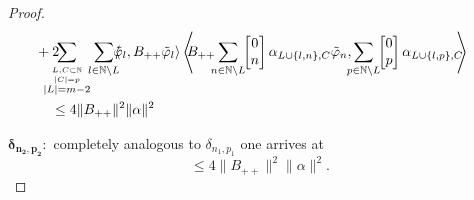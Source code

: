 \documentclass[b5paper,draft,openbib,12pt]{memoir}
\begin{document}
\begin{proof}
\begin{align}
&\hspace{-0.4cm}+2\!\hspace{-0.4cm}\sum_{\overset{L,C\subset \mathbb{N}}{\overset{|C|=p}{|L|=m-2}}}\!\!\sum_{l\in\mathbb{N}\backslash L}\!\!\!
\left\langle \!\!\! \tilde{\varphi}_{l}, B_{++} \tilde{\varphi}_l \right\rangle \left\langle\!\!\! B_{++}\!\!\!\sum_{n\in\mathbb{N}\backslash L}\!\!\left[\begin{matrix}0\\n\end{matrix}\right] \alpha_{L\cup \{l,n\},C} \tilde{\varphi}_n,\!\!\!\sum_{p\in\mathbb{N}\backslash L} \!\!\left[\begin{matrix}0\\p\end{matrix}\right]\alpha_{L\cup\{l,p\},C}\!\!\! \right\rangle\\
&\le 4 \|B_{++}\|^2 \|\alpha\|^2
\end{align}

\(\boldsymbol{\delta_{n_2,p_2}:}\) completely analogous to \(\delta_{n_1,p_1}\) one arrives at 
\begin{equation}
  \le 4\|B_{++}\|^2\|\alpha\|^2.
\end{equation}


\end{proof}
\end{document}
